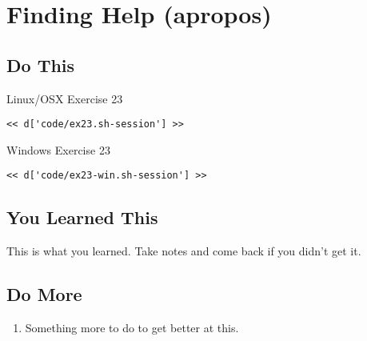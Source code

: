 \chapter{Finding Help (apropos)}

\section{Do This}

\begin{code}{Linux/OSX Exercise 23}
\begin{Verbatim}
<< d['code/ex23.sh-session'] >>
\end{Verbatim}
\end{code}

\begin{code}{Windows Exercise 23}
\begin{Verbatim}
<< d['code/ex23-win.sh-session'] >>
\end{Verbatim}
\end{code}

\section{You Learned This}

This is what you learned.  Take notes and come back if you didn't get it.

\section{Do More}

\begin{enumerate}
\item Something more to do to get better at this.
\end{enumerate}

